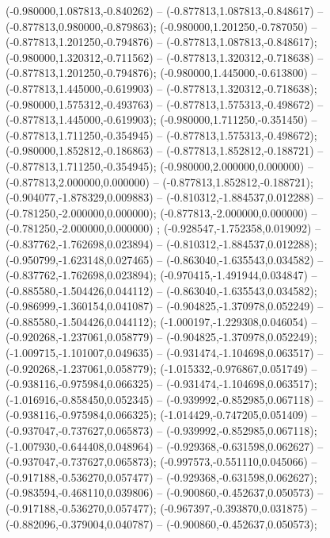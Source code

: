  (-0.980000,1.087813,-0.840262) -- (-0.877813,1.087813,-0.848617) -- (-0.877813,0.980000,-0.879863);
 (-0.980000,1.201250,-0.787050) -- (-0.877813,1.201250,-0.794876) -- (-0.877813,1.087813,-0.848617);
 (-0.980000,1.320312,-0.711562) -- (-0.877813,1.320312,-0.718638) -- (-0.877813,1.201250,-0.794876);
 (-0.980000,1.445000,-0.613800) -- (-0.877813,1.445000,-0.619903) -- (-0.877813,1.320312,-0.718638);
 (-0.980000,1.575312,-0.493763) -- (-0.877813,1.575313,-0.498672) -- (-0.877813,1.445000,-0.619903);
 (-0.980000,1.711250,-0.351450) -- (-0.877813,1.711250,-0.354945) -- (-0.877813,1.575313,-0.498672);
 (-0.980000,1.852812,-0.186863) -- (-0.877813,1.852812,-0.188721) -- (-0.877813,1.711250,-0.354945);
 (-0.980000,2.000000,0.000000) -- (-0.877813,2.000000,0.000000) -- (-0.877813,1.852812,-0.188721);
 (-0.904077,-1.878329,0.009883) -- (-0.810312,-1.884537,0.012288) -- (-0.781250,-2.000000,0.000000);
 (-0.877813,-2.000000,0.000000) -- (-0.781250,-2.000000,0.000000) ;
 (-0.928547,-1.752358,0.019092) -- (-0.837762,-1.762698,0.023894) -- (-0.810312,-1.884537,0.012288);
 (-0.950799,-1.623148,0.027465) -- (-0.863040,-1.635543,0.034582) -- (-0.837762,-1.762698,0.023894);
 (-0.970415,-1.491944,0.034847) -- (-0.885580,-1.504426,0.044112) -- (-0.863040,-1.635543,0.034582);
 (-0.986999,-1.360154,0.041087) -- (-0.904825,-1.370978,0.052249) -- (-0.885580,-1.504426,0.044112);
 (-1.000197,-1.229308,0.046054) -- (-0.920268,-1.237061,0.058779) -- (-0.904825,-1.370978,0.052249);
 (-1.009715,-1.101007,0.049635) -- (-0.931474,-1.104698,0.063517) -- (-0.920268,-1.237061,0.058779);
 (-1.015332,-0.976867,0.051749) -- (-0.938116,-0.975984,0.066325) -- (-0.931474,-1.104698,0.063517);
 (-1.016916,-0.858450,0.052345) -- (-0.939992,-0.852985,0.067118) -- (-0.938116,-0.975984,0.066325);
 (-1.014429,-0.747205,0.051409) -- (-0.937047,-0.737627,0.065873) -- (-0.939992,-0.852985,0.067118);
 (-1.007930,-0.644408,0.048964) -- (-0.929368,-0.631598,0.062627) -- (-0.937047,-0.737627,0.065873);
 (-0.997573,-0.551110,0.045066) -- (-0.917188,-0.536270,0.057477) -- (-0.929368,-0.631598,0.062627);
 (-0.983594,-0.468110,0.039806) -- (-0.900860,-0.452637,0.050573) -- (-0.917188,-0.536270,0.057477);
 (-0.967397,-0.393870,0.031875) -- (-0.882096,-0.379004,0.040787) -- (-0.900860,-0.452637,0.050573);
